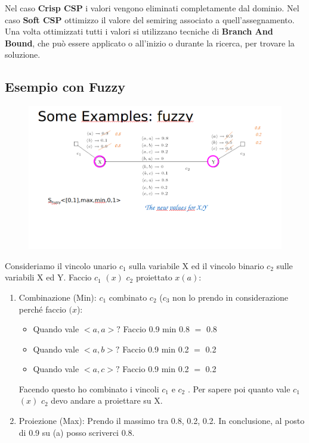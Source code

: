 Nel caso \textbf{Crisp CSP} i valori vengono eliminati completamente dal
dominio. Nel caso \textbf{Soft CSP} ottimizzo il valore del semiring associato a
quell'assegnamento. Una volta ottimizzati tutti i valori si utilizzano tecniche
di \textbf{Branch And Bound}, che può essere applicato o all'inizio o durante la
ricerca, per trovare la soluzione.

\subsection{Esempio con Fuzzy}
\begin{figure}[htp]
    \centering
    \includegraphics[width=15cm, keepaspectratio]{img/Cap5/ffuzzy2.png}
\end{figure}
Consideriamo il vincolo unario $c_1$ sulla variabile X ed il vincolo binario $c_2$
sulle variabili X ed Y. Faccio $c_1$ $(x)$ $c_2$ proiettato $x(a)$:
\begin{enumerate}
    \item Combinazione (Min): $c_1$ combinato $c_2$ ($c_3$ non lo prendo in
          considerazione perché faccio $(x$):
          \begin{itemize}
              \item Quando vale $< a, a >?$ Faccio 0.9 min 0.8 $=$ 0.8
              \item Quando vale $< a, b >?$ Faccio 0.9 min 0.2 $=$ 0.2
              \item Quando vale $< a, c >?$ Faccio 0.9 min 0.2 $=$ 0.2
          \end{itemize}
          Facendo questo ho combinato i vincoli $c_1$ e $c_2$ . Per sapere poi quanto
          vale $c_1$ $(x)$ $c_2$ devo andare a proiettare su X.
    \item Proiezione (Max): Prendo il massimo tra 0.8, 0.2, 0.2. In conclusione,
          al posto di 0.9 su (a) posso scriverci 0.8.
\end{enumerate}
